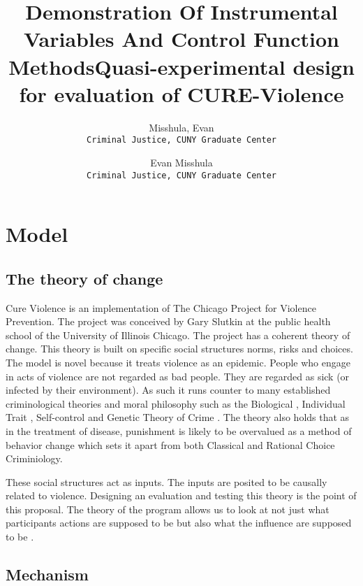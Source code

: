 \documentclass[11pt]{article}
\author{Misshula, Evan\\ \texttt{Criminal Justice, CUNY Graduate Center}}
\title{Demonstration Of Instrumental Variables And Control Function Methods}
\author{Evan Misshula\\ \texttt{Criminal Justice, CUNY Graduate Center}}
\date{}
\title{Quasi-experimental design for evaluation of CURE-Violence}
\begin{document}
\maketitle





\section{Model}
\label{sec-1}

\subsection{The theory of change}
\label{sec-1-1}

Cure Violence is an implementation of The Chicago Project for Violence
Prevention.  The project was conceived by Gary Slutkin
\parencite{ransford201321,slutkin2012violence} at the public health
school of the University of Illinois Chicago.  The project has a
coherent theory of change.  This theory is built on specific social
structures norms, risks and choices.  The model is novel because it
treats violence as an epidemic.  People who engage in acts of violence
are not regarded as bad people.  They are regarded as sick (or
infected by their environment).  As such it runs counter to many
established criminological theories and moral philosophy such as the
Biological
\parencite{Gibson2002,Lambroso1890,Lambroso1890a,Gould1996},
Individual Trait \parencite{glueck1950unraveling,glueck1956physique},
Self-control \parencite{Gott1990,Akers1991} and Genetic Theory of
Crime
\parencite{moffitt1993adolescence,moffitt2005new,barkan1992retreat}.
The theory also holds that as in the treatment of disease, punishment
is likely to be overvalued as a method of behavior change which sets
it apart from both Classical
\parencite{beccaria2009crimes,devine1981cesare} and Rational Choice
\parencite{becker1974crime,levitt2004understanding} Criminiology.


These social structures act as inputs.  The inputs are posited to be
causally related to violence. Designing an evaluation and testing this
theory is the point of this proposal.  The theory of the program
allows us to look at not just what participants actions are supposed
to be but also what the influence are supposed to be \parencite{Leeuw2003}.

\subsection{Mechanism}
\label{sec-1-2}
\end{document}
